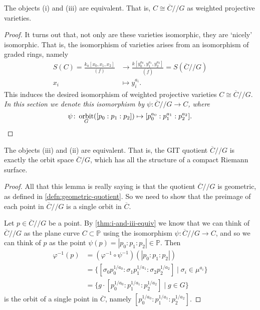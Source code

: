 \documentclass[10pt,notitlepage]{article}
\numberwithin{equation}{subsection}
\DeclareMathOperator{\orbit}{orbit}
\newcommand{\pee}{\mathbb{P}}
\newcommand{\cover}[1]{\overline{#1}}
\newcommand{\kathree}{k_a[x_0,x_1,x_2]}
\newcommand{\sslash}{/\!\!/}
\begin{document}
        \begin{theorem}\label{thm:i-and-iii-equiv}
            The objects (i) and (iii) are equivalent.
            That is, $C\cong\cover{C}\sslash G$ as weighted projective varieties.
        \end{theorem}

        \begin{proof}
            It turns out that, not only are these varieties isomorphic, they are `nicely' isomorphic.
            That is, the isomorphism of varieties arises from an isomorphism of graded rings, namely
            \begin{align*}
                S(C) = \frac{\kathree}{(f)} &\rightarrow \frac{k[y_0^{a_0},y_1^{a_1},y_2^{a_2}]}{(\cover{f})} = S(\cover{C}\sslash G)\\
                x_i &\mapsto y_i^{a_i}.
            \end{align*}
            This induces the desired isomorphism of weighted projective varieties $C\cong\cover{C}\sslash G$.
            \emph{In this section we denote this isomorphism by $\psi\colon \cover{C}\sslash G\to C$, where
            \[
                \psi\colon\orbit_G([p_0:p_1:p_2])\mapsto[p_0^{a_0}:p_1^{a_1}:p_2^{a_2}].\qedhere
            \]}
        \end{proof}

        \begin{lemma}\label{lem:git-quotient-is-orbit-space}
            The objects (iii) and (ii) are equivalent.
            That is, the GIT quotient $\cover{C}\sslash G$ is exactly the orbit space $\cover{C}/G$, which has all the structure of a compact Riemann surface.
        \end{lemma}

        \begin{proof}
            All that this lemma is really saying is that the quotient $\cover{C}\sslash G$ is geometric, as defined in \cref{defn:geometric-quotient}.
            So we need to show that the preimage of each point in $\cover{C}\sslash G$ is a single orbit in $\cover{C}$.

            Let $p\in\cover{C}\sslash G$ be a point.
            By \cref{thm:i-and-iii-equiv} we know that we can think of $\cover{C}\sslash G$ as the plane curve $C\subset\pee$ using the isomorphism $\psi\colon\cover{C}\sslash G\to C$, and so we can think of $p$ as the point $\psi(p)=|p_0:p_1:p_2|\in\pee$.
            Then
            \begin{align*}
                \varphi^{-1}(p) &= (\varphi^{-1}\circ\psi^{-1})(|p_0:p_1:p_2|) \\
                &= \{[\sigma_0 p_0^{1/a_0}:\sigma_1 p_1^{1/a_1}:\sigma_2 p_2^{1/a_2}] \mid \sigma_i\in\mu^{a_i}\} \\
                & = \{g\cdot[p_0^{1/a_0}:p_1^{1/a_1}:p_2^{1/a_2}] \mid g\in G\}
            \end{align*}
            is the orbit of a single point in $\cover{C}$, namely $[p_0^{1/a_0}:p_1^{1/a_1}:p_2^{1/a_2}]$.
        \end{proof}
\end{document}
